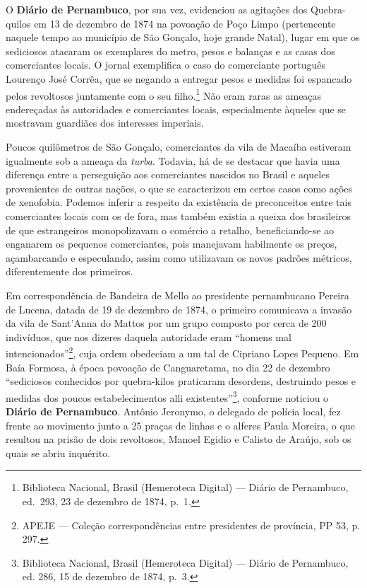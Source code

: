 \begin{refsection}
O \textbf{Diário de Pernambuco}, por sua vez, evidenciou as agitações dos Quebra-quilos em 13 de dezembro de 1874 na povoação de Poço Limpo (pertencente naquele tempo ao município de São Gonçalo, hoje grande Natal), lugar em que os sediciosos atacaram os exemplares do metro, pesos e balanças e as casas dos comerciantes locais. O jornal exemplifica o caso do comerciante português Lourenço José Corrêa, que se negando a entregar pesos e medidas foi espancado pelos revoltosos juntamente com o seu filho.\footnote{Biblioteca Nacional, Brasil (Hemeroteca Digital) --- Diário de Pernambuco, ed.~293, 23 de dezembro de 1874, p.~1.} Não eram raras as ameaças endereçadas às autoridades e comerciantes locais, especialmente àqueles que se mostravam guardiães dos interesses imperiais.  

Poucos quilômetros de São Gonçalo, comerciantes da vila de Macaíba estiveram igualmente sob a ameaça da \textit{turba}. Todavia, há de se destacar que havia uma diferença entre a perseguição aos comerciantes nascidos no Brasil e aqueles provenientes de outras nações, o que se caracterizou em certos casos como ações de xenofobia. Podemos inferir a respeito da existência de preconceitos entre tais comerciantes locais com os de fora, mas também existia a queixa dos brasileiros de que estrangeiros monopolizavam o comércio a retalho, beneficiando-se ao enganarem os pequenos comerciantes, pois manejavam habilmente os preços, açambarcando e especulando, assim como utilizavam os novos padrões métricos, diferentemente dos primeiros. 

Em correspondência de Bandeira de Mello ao presidente pernambucano Pereira de Lucena, datada de 19 de dezembro de 1874, o primeiro comunicava a invasão da vila de Sant’Anna do Mattos por um grupo composto por cerca de 200 indivíduos, que nos dizeres daquela autoridade eram “homens mal intencionados”\footnote{APEJE --- Coleção correspondências entre presidentes de província, PP 53, p. 297.}, cuja ordem obedeciam a um tal de Cipriano Lopes Pequeno. Em Baía Formosa, à época povoação de Canguaretama, no dia 22 de dezembro “sediciosos conhecidos por quebra-kilos praticaram desordens, destruindo pesos e medidas dos poucos estabelecimentos alli existentes”\footnote{Biblioteca Nacional, Brasil (Hemeroteca Digital) --- Diário de Pernambuco, ed. 286, 15 de dezembro de 1874, p.~3.}, conforme noticiou o \textbf{Diário de Pernambuco}. Antônio Jeronymo, o delegado de polícia local, fez frente ao movimento junto a 25 praças de linhas e o alferes Paula Moreira, o que resultou na prisão de dois revoltosos, Manoel Egidio e Calisto de Araújo, sob os quais se abriu inquérito. 


\end{refsection}
